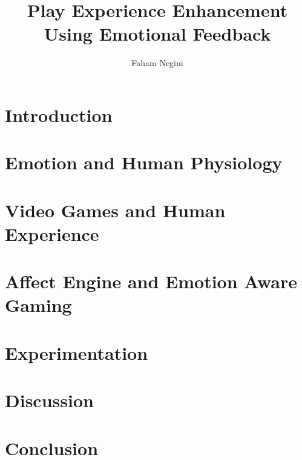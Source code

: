 \documentclass{uofsthesis-cs}
\title{Play Experience Enhancement Using Emotional Feedback}
\author{Faham Negini}
\begin{document}
\maketitle

\frontmatter




\chapter{Introduction}                           \label{chap:intro}       
\chapter{Emotion and Human Physiology}           \label{chap:emotion}     
\chapter{Video Games and Human Experience}       \label{chap:video-games} 
\chapter{Affect Engine and Emotion Aware Gaming} \label{chap:impl}        
\chapter{Experimentation}                        \label{chap:exprm}       
\chapter{Discussion}                             \label{chap:discus}      
\chapter{Conclusion}                             \label{chap:conclusion}  

\end{document}
